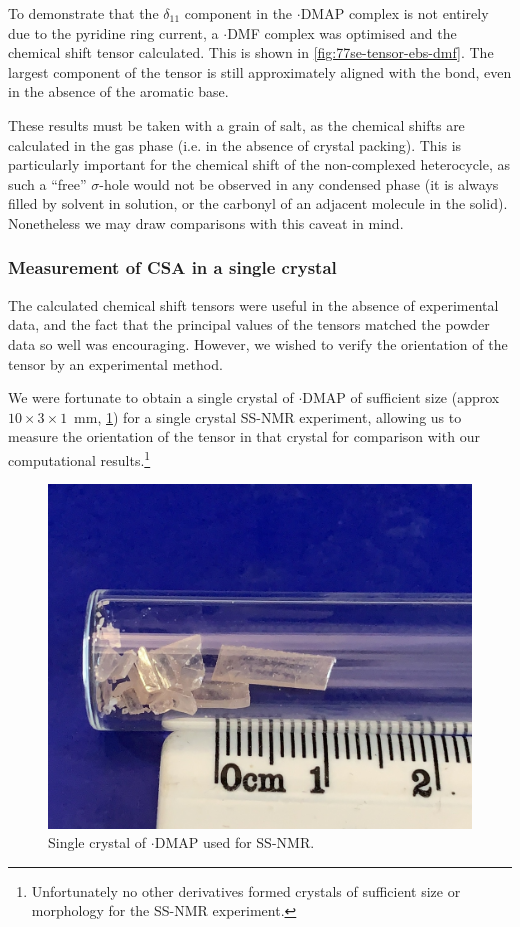 \begin{refsection}
To demonstrate that the $\delta_{11}$ component in the $\cdot$DMAP complex is not entirely due to the pyridine ring current, a $\cdot$DMF complex was optimised and the chemical shift tensor calculated.
This is shown in \cref{fig:77se-tensor-ebs-dmf}.
The largest component of the tensor is still approximately aligned with the  bond, even in the absence of the aromatic base.

These results must be taken with a grain of salt, as the chemical shifts are calculated in the gas phase (i.e. in the absence of crystal packing).
This is particularly important for the chemical shift of the non-complexed heterocycle, as such a ``free'' $\sigma$-hole would not be observed in any condensed phase (it is always filled by solvent in solution, or the carbonyl of an adjacent molecule in the solid).
Nonetheless we may draw comparisons with this caveat in mind.

\subsubsection{Measurement of CSA in a single crystal}
The calculated chemical shift tensors were useful in the absence of experimental data, and the fact that the principal values of the tensors matched the powder data so well was encouraging.
However, we wished to verify the orientation of the tensor by an experimental method.

We were fortunate to obtain a single crystal of $\cdot$DMAP of sufficient size (approx $10\times3\times1$~mm, \cref{fig:ebs-ph-dmap-picture}) for a single crystal SS-NMR experiment, allowing us to measure the orientation of the tensor in that crystal for comparison with our computational results.\footnote{Unfortunately no other derivatives formed crystals of sufficient size or morphology for the SS-NMR experiment.}

\begin{figure}
  \centering
  \includegraphics[width=0.4\linewidth]{Figures/ebs-ph-dmap-picture.jpg}
  \caption{Single crystal of $\cdot$DMAP used for SS-NMR.}
  \label{fig:ebs-ph-dmap-picture}
\end{figure}


\end{refsection}
